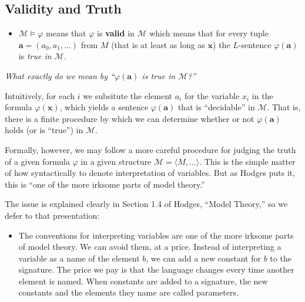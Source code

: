 \documentclass[a4paper,UKenglish,cleveref,autoref,thm-restate,12pt]{lipics-v2021-wjd}
\newcommand{\<}{\langle}
\renewcommand{\>}{\rangle}
\begin{document}

\subsection{Validity and Truth}\label{validity-and-truth}

\begin{itemize}
\item
  \(\mathcal M \vDash \varphi\) means that \(\varphi\) is \textbf{valid}
  in \(\mathcal M\) which means that for every tuple
  \(\mathbf a = (a_0, a_1, \dots )\) from \(M\) (that is at least as
  long as \(\mathbf x\)) the \(L\)-sentence \(\varphi(\mathbf a)\) is
  \emph{true in \(\mathcal M\)}.
\end{itemize}

\emph{What exactly do we mean by ``\(\varphi(\mathbf a)\) is true in
\(\mathcal M\)?''}

Intuitively, for each \(i\) we subsitute the element \(a_i\) for the
variable \(x_i\) in the formula \(\varphi(\mathbf x)\), which yields a
sentence \(\varphi(\mathbf a)\) that is ``decidable'' in \(\mathcal M\).
That is, there is a finite procedure by which we can determine whether
or not \(\varphi(\mathbf a)\) holds (or is ``true'') in \(\mathcal M\).

Formally, however, we may follow a more careful procedure for judging
the truth of a given formula \(\varphi\) in a given structure
\(\mathcal M = \langle M, \dots\rangle\). This is the simple matter of
how syntactically to denote interpretation of variables. But as Hodges
puts it, this is ``one of the more irksome parts of model theory.''

The issue is explained clearly in Section 1.4 of Hodges, ``Model
Theory,'' so we defer to that presentation:

\begin{itemize}
\item
  The conventions for interpreting variables are one of the more irksome
  parts of model theory. We can avoid them, at a price. Instead of
  interpreting a variable as a name of the element \(b\), we can add a
  new constant for \(b\) to the signature. The price we pay is that the
  language changes every time another element is named. When constants
  are added to a signature, the new constants and the elements they name
  are called parameters.
\end{itemize}
\end{document}
